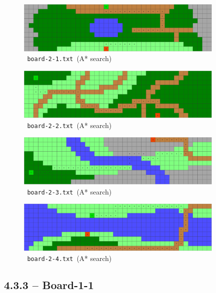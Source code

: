 \newpage

\begin{figure}[H]
\centering
\includegraphics[width=0.9\textwidth]{images/board-2-1}
\caption{\texttt{~board-2-1.txt~}(A* search)}
\end{figure}

\begin{figure}[H]
\centering
\includegraphics[width=0.9\textwidth]{images/board-2-2}
\caption{\texttt{~board-2-2.txt~}(A* search)}
\end{figure}

\begin{figure}[H]
\centering
\includegraphics[width=0.9\textwidth]{images/board-2-3}
\caption{\texttt{~board-2-3.txt~}(A* search)}
\end{figure}

\begin{figure}[H]
\centering
\includegraphics[width=0.9\textwidth]{images/board-2-4}
\caption{\texttt{~board-2-4.txt~}(A* search)}
\end{figure}

\newpage
\subsection*{4.3.3 -- Board-1-1}

